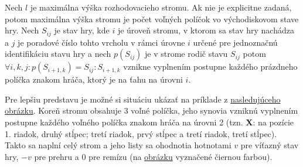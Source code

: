 Nech $l$ je maximálna výška rozhodovacieho stromu.
Ak nie je explicitne zadaná, potom maximálna výška stromu je počet voľných políčok vo východiskovom stave hry.
Nech $S_{ij}$ je stav hry, kde $i$ je úroveň stromu, v ktorom sa stav hry nachádza a $j$ je poradové číslo tohto vrcholu
v rámci úrovne $i$ určené pre jednoznačnú identifikáciu stavu hry a nech $p(S_{ij})$ je v strome rodič stavu $S_{ij}$
potom $\forall i, k, j \colon p(S_{i+1,k}) = S_{ij} \colon S_{i+1,k}$ vznikne vyplnením postupne každého
prázdneho políčka znakom hráča, ktorý je na ťahu na úrovni $i$.

Pre lepšiu predstavu je možné si situáciu ukázať na príklade z \hyperref[figure:minimax-tree]{nasledujúceho obrázku}.
Koreň stromu obsahuje 3 voľné políčka, jeho synovia vzniknú vyplnením postupne každého voľného políčka znakom hráča na
úrovni 2 (tzn. \textbf{X}: na pozície 1. riadok, druhý stĺpec; tretí riadok, prvý stĺpec a tretí riadok, tretí stĺpec).
Takto sa naplní celý strom a jeho listy sa ohodnotia hotnotami $v$ pre víťazný stav hry, $-v$ pre prehru a $0$ pre
remízu (na \hyperref[figure:minimax-tree]{obrázku} vyznačené čiernou farbou).

